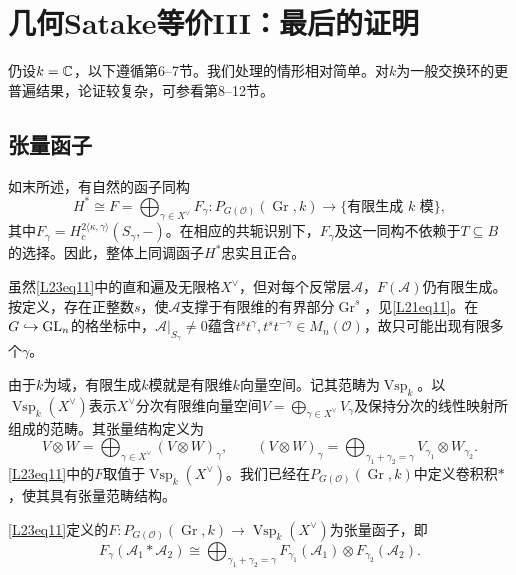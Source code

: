 \chapter{几何Satake等价III：最后的证明}\label{L23}
仍设$k=\mathbb{C}$，以下遵循第6--7节。我们处理的情形相对简单。对$k$为一般交换环的更普遍结果，论证较复杂，可参看第8--12节。
\section{张量函子}\label{L23S1}
如末所述，有自然的函子同构
\begin{equation}\tag{1.1}\label{L23eq11}H^*\cong F=\bigoplus_{\gamma\in X^\vee}F_\gamma:P_{G(\mathcal O)}(\operatorname{Gr},k)\to\{\text{有限生成 }k\text{ 模}\},\end{equation}
其中$F_\gamma=H_c^{2\langle\kappa,\gamma\rangle}(S_\gamma,-)$。在相应的共轭识别下，$F_\gamma$及这一同构不依赖于$T\subseteq B$的选择。因此，整体上同调函子$H^*$忠实且正合。
\begin{note}[L23S1O1]
虽然\eqref{L23eq11}中的直和遍及无限格$X^\vee$，但对每个反常层$\mathcal A$，$F(\mathcal A)$仍有限生成。按定义，存在正整数$s$，使$\mathcal A$支撑于有限维的有界部分$\operatorname{Gr}^s$，见\eqref{L21eq11}。在$G\hookrightarrow\operatorname{GL}_n$的格坐标中，$\mathcal A|_{S_\gamma}\ne0$蕴含$t^st^\gamma,t^st^{-\gamma}\in M_n(\mathcal O)$，故只可能出现有限多个$\gamma$。
\end{note}
由于$k$为域，有限生成$k$模就是有限维$k$向量空间。记其范畴为$\operatorname{Vsp}_k$。以$\operatorname{Vsp}_k(X^\vee)$表示$X^\vee$分次有限维向量空间$V=\bigoplus_{\gamma\in X^\vee}V_\gamma$及保持分次的线性映射所组成的范畴。其张量结构定义为
\[V\otimes W=\bigoplus_{\gamma\in X^\vee}(V\otimes W)_\gamma,\qquad(V\otimes W)_\gamma=\bigoplus_{\gamma_1+\gamma_2=\gamma}V_{\gamma_1}\otimes W_{\gamma_2}.\]
\eqref{L23eq11}中的$F$取值于$\operatorname{Vsp}_k(X^\vee)$。我们已经在$P_{G(\mathcal O)}(\operatorname{Gr},k)$中定义卷积积$*$，使其具有张量范畴结构。
\begin{proposition}\label{L23S1O2}
\eqref{L23eq11}定义的$F:P_{G(\mathcal O)}(\operatorname{Gr},k)\to\operatorname{Vsp}_k(X^\vee)$为张量函子，即
\[F_\gamma(\mathcal A_1*\mathcal A_2)\cong\bigoplus_{\gamma_1+\gamma_2=\gamma}F_{\gamma_1}(\mathcal A_1)\otimes F_{\gamma_2}(\mathcal A_2).\]
\end{proposition}
